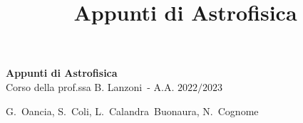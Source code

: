 \documentclass[11pt]{book} %
\begin{document}
\title{Appunti di Astrofisica}


\begingroup
\thispagestyle{empty}
\centering
\vspace*{5cm}
\par\normalfont\fontsize{35}{35}\sffamily\selectfont
\textbf{Appunti di Astrofisica}\\
{\LARGE Corso della prof.ssa B. Lanzoni~- A.A. $2022/2023$}\par %
\vspace*{1cm}
{\Huge G.~Oancia, S.~Coli, L.~Calandra~Buonaura, N.~Cognome}\par %
\endgroup

\end{document}
